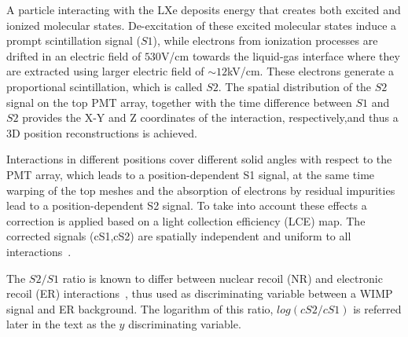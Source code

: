 A particle interacting with the LXe deposits energy that creates both excited and ionized molecular states. De-excitation of these excited molecular states induce a prompt scintillation signal ($S1$), while 
electrons from ionization processes are drifted in an electric field of $530$V/cm towards the liquid-gas interface where they are extracted using larger electric field of $\sim12$kV/cm. 
These electrons generate a proportional scintillation, which is called $S2$. The spatial distribution of the $S2$ signal on the top PMT array, together with the time difference between $S1$ and $S2$ provides the X-Y and Z coordinates of the interaction, respectively,and thus a 3D position reconstructions is achieved.

Interactions in different positions cover different solid angles with respect to the PMT array, which leads to a position-dependent S1 signal, at the same time warping of the top meshes and the absorption of electrons by residual impurities lead to a position-dependent S2 signal. To take into account these effects a correction is applied based on a light collection efficiency (LCE) map. The corrected signals (cS1,cS2) are spatially independent and uniform to all interactions~\cite{xe100_instr2012}.

The $S2/S1$ ratio is known to differ between nuclear recoil (NR) and electronic recoil (ER) interactions~\cite{}, thus used as  discriminating variable between a WIMP signal and ER background.
The logarithm of this ratio, $log(cS2/cS1)$ is referred later in the text as the $y$ discriminating variable.


